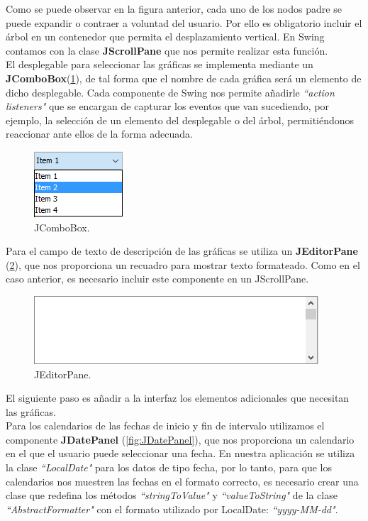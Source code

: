 \documentclass[12pt, a4paper]{book}
\begin{document}
Como se puede observar en la figura anterior, cada uno de los nodos padre se puede expandir o contraer a voluntad del usuario. Por ello es obligatorio incluir el árbol en un contenedor que permita el desplazamiento vertical. En Swing contamos con la clase \textbf{JScrollPane} que nos permite realizar esta función.
\\

El desplegable para seleccionar las gráficas se implementa mediante un \textbf{JComboBox}(\ref{fig:JComboBox}), de tal forma que el nombre de cada gráfica será un elemento de dicho desplegable. Cada componente de Swing nos permite añadirle \textit{``action listeners"} que se encargan de capturar los eventos que van sucediendo, por ejemplo, la selección de un elemento del desplegable o del árbol, permitiéndonos reaccionar ante ellos de la forma adecuada.

\begin{figure}[htbp]
	\centering
	\includegraphics{figuras/JComboBox.png}
	\caption{JComboBox.}
	\label{fig:JComboBox}
	\end {figure}

Para el campo de texto de descripción de las gráficas se utiliza un \textbf{JEditorPane} (\ref{fig:JEditorPane}), que nos proporciona un recuadro para mostrar texto formateado. Como en el caso anterior, es necesario incluir este componente en un JScrollPane.

\begin{figure}[htbp]
	\centering
	\includegraphics{figuras/JEditorPane.png}
	\caption{JEditorPane.}
	\label{fig:JEditorPane}
	\end {figure}
\newpage

El siguiente paso es añadir a la interfaz los elementos adicionales que necesitan las gráficas.\\

Para los calendarios de las fechas de inicio y fin de intervalo utilizamos el componente \textbf{JDatePanel} (\ref{fig:JDatePanel}), que nos proporciona un calendario en el que el usuario puede seleccionar una fecha. En nuestra aplicación se utiliza la clase \textit{``LocalDate"} para los datos de tipo fecha, por lo tanto, para que los calendarios nos muestren las fechas en el formato correcto, es necesario crear una clase que redefina los métodos \textit{``stringToValue"} y \textit{``valueToString"} de la clase \textit{``AbstractFormatter"} con el formato utilizado por LocalDate: \textit{``yyyy-MM-dd"}.
\end{document}

